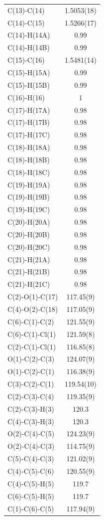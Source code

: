 \begin{center}
{\begin{supertabular}{p{1.5in}c}
C(13)-C(14) &1.5053(18)\\
C(14)-C(15) &1.5266(17)\\
C(14)-H(14A) &0.99\\
C(14)-H(14B) &0.99\\
C(15)-C(16) &1.5481(14)\\
C(15)-H(15A) &0.99\\
C(15)-H(15B) &0.99\\
C(16)-H(16) &1\\
C(17)-H(17A) &0.98\\
C(17)-H(17B) &0.98\\
C(17)-H(17C) &0.98\\
C(18)-H(18A) &0.98\\
C(18)-H(18B) &0.98\\
C(18)-H(18C) &0.98\\
C(19)-H(19A) &0.98\\
C(19)-H(19B) &0.98\\
C(19)-H(19C) &0.98\\
C(20)-H(20A) &0.98\\
C(20)-H(20B) &0.98\\
C(20)-H(20C) &0.98\\
C(21)-H(21A) &0.98\\
C(21)-H(21B) &0.98\\
C(21)-H(21C) &0.98\\
C(2)-O(1)-C(17)&117.45(9)\\
C(4)-O(2)-C(18)&117.05(9)\\
C(6)-C(1)-C(2)&121.55(9)\\
C(6)-C(1)-Cl(1)&121.59(8)\\
C(2)-C(1)-Cl(1)&116.85(8)\\
O(1)-C(2)-C(3)&124.07(9)\\
O(1)-C(2)-C(1)&116.38(9)\\
C(3)-C(2)-C(1)&119.54(10)\\
C(2)-C(3)-C(4)&119.35(9)\\
C(2)-C(3)-H(3)&120.3\\
C(4)-C(3)-H(3)&120.3\\
O(2)-C(4)-C(5)&124.23(9)\\
O(2)-C(4)-C(3)&114.75(9)\\
C(5)-C(4)-C(3)&121.02(9)\\
C(4)-C(5)-C(6)&120.55(9)\\
C(4)-C(5)-H(5)&119.7\\
C(6)-C(5)-H(5)&119.7\\
C(1)-C(6)-C(5)&117.94(9)\\

\end{supertabular}}
\end{center}
